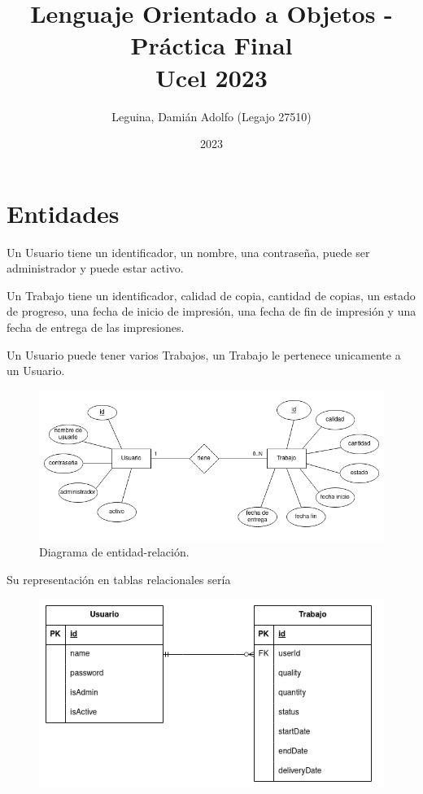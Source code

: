 \documentclass{article}
\title{Lenguaje Orientado a Objetos - Práctica Final \\ \small Ucel 2023}
\author{Leguina, Damián Adolfo (Legajo 27510)}
\date{2023}
\begin{document}
\maketitle

\tableofcontents

\newpage

\section{Entidades}

Un Usuario tiene un identificador, un nombre, una contraseña, puede ser administrador y puede estar activo.

Un Trabajo tiene un identificador, calidad de copia, cantidad de copias, un estado de progreso, una fecha de inicio de impresión, una fecha de fin de impresión y una fecha de entrega de las impresiones.

Un Usuario puede tener varios Trabajos, un Trabajo le pertenece unicamente a un Usuario.

\begin{figure}[h]
    \centering
    \includegraphics[width=\linewidth,keepaspectratio]{erd.png}
    \caption{Diagrama de entidad-relación.}
\end{figure}

Su representación en tablas relacionales sería

\begin{figure}[h]
    \centering
    \includegraphics[width=\linewidth,keepaspectratio]{erd-2.png}
\end{figure}
\end{document}

